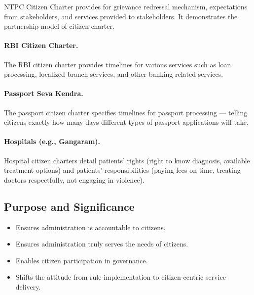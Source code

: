\begin{KeyConcept}
NTPC Citizen Charter provides for grievance redressal mechanism, expectations from stakeholders, and services provided to stakeholders. It demonstrates the partnership model of citizen charter.
\end{KeyConcept}

\paragraph{RBI Citizen Charter.} The RBI citizen charter provides timelines for various services such as loan processing, localized branch services, and other banking-related services.

\paragraph{Passport Seva Kendra.} The passport citizen charter specifies timelines for passport processing --- telling citizens exactly how many days different types of passport applications will take.

\paragraph{Hospitals (e.g., Gangaram).} Hospital citizen charters detail patients' rights (right to know diagnosis, available treatment options) and patients' responsibilities (paying fees on time, treating doctors respectfully, not engaging in violence).

\subsection{Purpose and Significance}
\begin{itemize}
\item Ensures administration is accountable to citizens.
\item Ensures administration truly serves the needs of citizens.
\item Enables citizen participation in governance.
\item Shifts the attitude from rule-implementation to citizen-centric service delivery.
\end{itemize}

